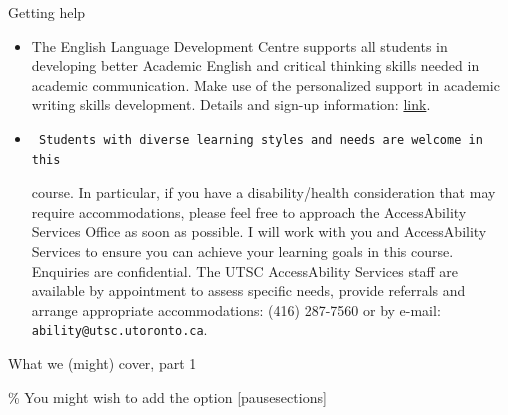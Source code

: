 \documentclass[ignorenonframetext,]{beamer}
\begin{document}
\begin{frame}[fragile]{Getting help}
\protect\hypertarget{getting-help}{}

\begin{itemize}
\item
  The English Language Development Centre supports all students in
  developing better Academic English and critical thinking skills needed
  in academic communication. Make use of the personalized support in
  academic writing skills development. Details and sign-up information:
  \href{http://www.utsc.utoronto.ca/eld/}{link}.
\item
\begin{verbatim}
 Students with diverse learning styles and needs are welcome in this
\end{verbatim}

  course. In particular, if you have a disability/health consideration
  that may require accommodations, please feel free to approach the
  AccessAbility Services Office as soon as possible. I will work with
  you and AccessAbility Services to ensure you can achieve your learning
  goals in this course. Enquiries are confidential. The UTSC
  AccessAbility Services staff are available by appointment to assess
  specific needs, provide referrals and arrange appropriate
  accommodations: (416) 287-7560 or by e-mail:
  \texttt{ability@utsc.utoronto.ca}.
\end{itemize}

\end{frame}

\begin{frame}{What we (might) cover, part 1}
\protect\hypertarget{what-we-might-cover-part-1}{}

\tableofcontents[sections={1-10}]  \% You might wish to add the option
{[}pausesections{]}

\end{frame}
\end{document}

